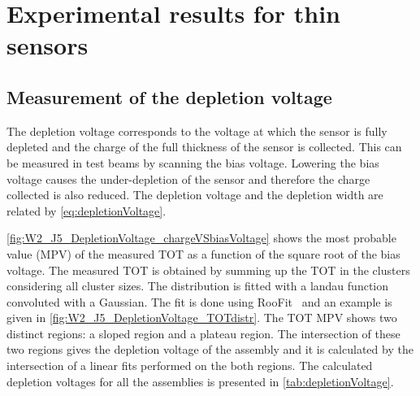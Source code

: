 \section{Experimental results for thin sensors}

\subsection{Measurement of the depletion voltage}

The depletion voltage corresponds to the voltage at which the sensor
is fully depleted and the charge of the full thickness of the sensor
is collected. This can be measured in test beams by scanning the bias
voltage. Lowering the bias voltage causes the under-depletion of the
sensor and therefore the charge collected is also reduced. The
depletion voltage and the depletion width are related by
\cref{eq:depletionVoltage}. 

\cref{fig:W2_J5_DepletionVoltage_chargeVSbiasVoltage} shows the most
probable value (MPV) of the measured TOT as a function of the square
root of the bias voltage. The measured TOT is obtained by summing up
the TOT in the clusters considering all cluster sizes. The
distribution is fitted with a landau function convoluted with a
Gaussian. The fit is done using RooFit~\cite{Cranmer:2012sba} and an
example is given in \cref{fig:W2_J5_DepletionVoltage_TOTdistr}. The
TOT MPV shows two distinct regions: a sloped region and a plateau
region. The intersection of these two regions gives the depletion
voltage of the assembly and it is calculated by the intersection of a
linear fits performed on the both regions. The calculated depletion
voltages for all the assemblies is presented in
\cref{tab:depletionVoltage}.

